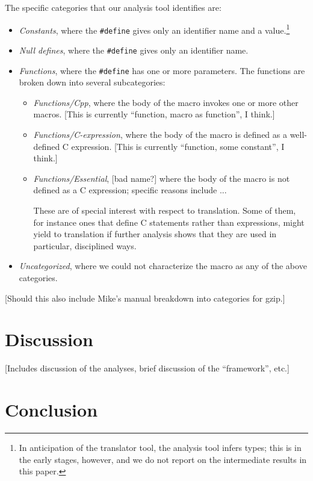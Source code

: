 The specific categories that our analysis tool identifies are:
\begin{itemize}

\item {\em Constants\/}, where the \verb+#define+ gives only an
identifier name and a value.\footnote{In anticipation of the
translator tool, the analysis tool infers types; this is in the early
stages, however, and we do not report on the intermediate results in
this paper.}  

\item {\em Null defines\/}, where the \verb+#define+ gives only an
identifier name.

\item {\em Functions\/}, where the \verb+#define+ has one or more
parameters.  The functions are broken down into several subcategories:
\begin{itemize}

\item {\em Functions/Cpp\/}, where the body of the macro invokes one
or more other macros.  [This is currently ``function, macro as
function'', I think.]

\item {\em Functions/C-expression\/}, where the body of the macro is
defined as a well-defined C expression.  [This is currently
``function, some constant'', I think.]

\item {\em Functions/Essential\/}, [bad name?] where the body of the
macro is not defined as a C expression; specific reasons include
...

These are of special interest with respect to translation.  Some of
them, for instance ones that define C statements rather than
expressions, might yield to translation if further analysis shows that
they are used in particular, disciplined ways.

\end{itemize}

\item {\em Uncategorized\/}, where we could not characterize the macro
as any of the above categories.

\end{itemize}

[Should this also include Mike's manual breakdown into categories for
gzip.]

\section{Discussion}\label{sec:discussion}

[Includes discussion of the analyses, brief discussion of the
``framework'', etc.]

\section{Conclusion}\label{sec:conclusion}

\small 




